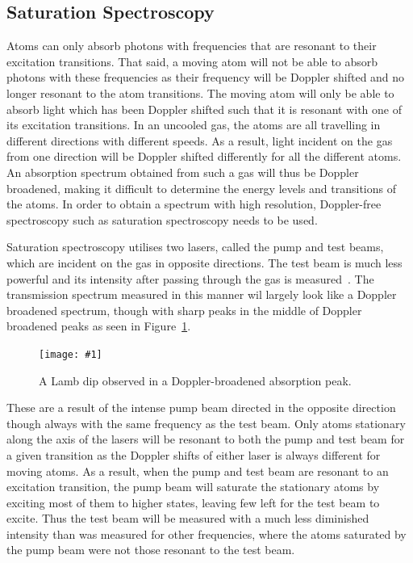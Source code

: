 \documentclass[twocolumn]{article}
\newcommand{\insertFigure}[1]{%
   \texttt{[image: \#1]}%
}
\begin{document}
\subsection{Saturation Spectroscopy}
Atoms can only absorb photons with frequencies that are resonant to their excitation transitions. That said, a moving atom will not be able to absorb photons with these frequencies as their frequency will be Doppler shifted and no longer resonant to the atom transitions. The moving atom will only be able to absorb light which has been Doppler shifted such that it is resonant with one of its excitation transitions. In an uncooled gas, the atoms are all travelling in different directions with different speeds. As a result, light incident on the gas from one direction will be Doppler shifted differently for all the different atoms. An absorption spectrum obtained from such a gas will thus be Doppler broadened, making it difficult to determine the energy levels and transitions of the atoms. In order to obtain a spectrum with high resolution, Doppler-free spectroscopy such as saturation spectroscopy needs to be used. \\
\par Saturation spectroscopy utilises two lasers, called the pump and test beams, which are incident on the gas in opposite directions. The test beam is much less powerful and its intensity after passing through the gas is measured~\cite{manual}. %
The transmission spectrum measured in this manner wil largely look like a Doppler broadened spectrum, though with sharp peaks in the middle of Doppler broadened peaks as seen in Figure~\ref{fig:Lamb}.
\begin{figure} [!h]
	\centering
	\insertFigure{Images/Lamb.png}
	\caption{A Lamb dip observed in a Doppler-broadened absorption peak.~\cite{manual}}
	\label{fig:Lamb}
\end{figure}
These are a result of the intense pump beam directed in the opposite direction though always with the same frequency as the test beam. Only atoms stationary along the axis of the lasers will be resonant to both the pump and test beam for a given transition as the Doppler shifts of either laser is always different for moving atoms. As a result, when the pump and test beam are resonant to an excitation transition, the pump beam will saturate the stationary atoms by exciting most of them to higher states, leaving few left for the test beam to excite. Thus the test beam will be measured with a much less diminished intensity than was measured for other frequencies, where the atoms saturated by the pump beam were not those resonant to the test beam. %
\end{document}
